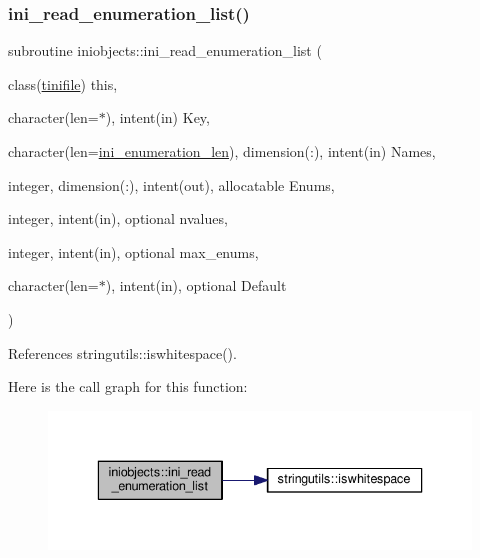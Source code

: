 \subsubsection{\texorpdfstring{ini\+\_\+read\+\_\+enumeration\+\_\+list()}{ini\_read\_enumeration\_list()}}
{\footnotesize\ttfamily subroutine iniobjects\+::ini\+\_\+read\+\_\+enumeration\+\_\+list (\begin{DoxyParamCaption}\item[{class(\mbox{\hyperlink{structiniobjects_1_1tinifile}{tinifile}})}]{this,  }\item[{character(len=$\ast$), intent(in)}]{Key,  }\item[{character(len=\mbox{\hyperlink{namespaceiniobjects_ad4e84129fd47c679fb1fcdd444d9fc84}{ini\+\_\+enumeration\+\_\+len}}), dimension(\+:), intent(in)}]{Names,  }\item[{integer, dimension(\+:), intent(out), allocatable}]{Enums,  }\item[{integer, intent(in), optional}]{nvalues,  }\item[{integer, intent(in), optional}]{max\+\_\+enums,  }\item[{character(len=$\ast$), intent(in), optional}]{Default }\end{DoxyParamCaption})\hspace{0.3cm}{\ttfamily [private]}}



References stringutils\+::iswhitespace().

Here is the call graph for this function\+:
\nopagebreak
\begin{figure}[H]
\begin{center}
\leavevmode
\includegraphics[width=336pt]{namespaceiniobjects_abd02c75afc73274d508c0c1eb3cecca5_cgraph}
\end{center}
\end{figure}
\mbox{\label{namespaceiniobjects_aca470402b1c4d58754217c0095202c84}} 
